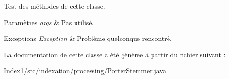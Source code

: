Test des méthodes de cette classe.


\begin{DoxyParams}{Paramètres}
{\em args} & Pas utilisé.\\
\hline
\end{DoxyParams}

\begin{DoxyExceptions}{Exceptions}
{\em Exception} & Problème quelconque rencontré. \\
\hline
\end{DoxyExceptions}


La documentation de cette classe a été générée à partir du fichier suivant \+:\begin{DoxyCompactItemize}
\item 
Index1/src/indexation/processing/Porter\+Stemmer.\+java\end{DoxyCompactItemize}
